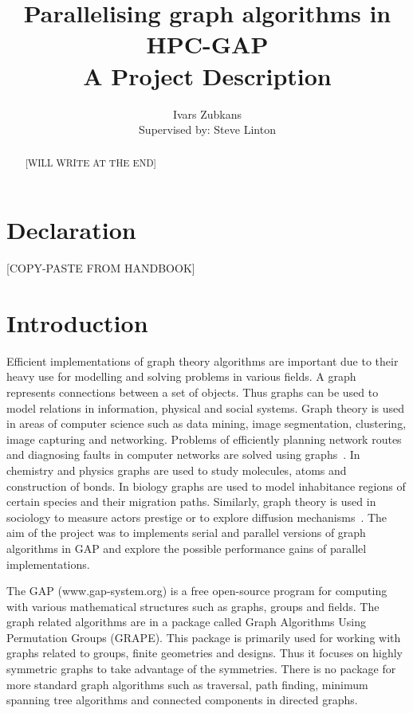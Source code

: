 \documentclass{report}
\title{Parallelising graph algorithms in HPC-GAP \\ \vspace{2 mm} {\large A Project Description}}
\author{Ivars Zubkans \\ \small Supervised by: Steve Linton}
\theoremstyle{plain}
\theoremstyle{definition}
\theoremstyle{remark}
\begin{document}
\maketitle

\begin{abstract}
[WILL WRITE AT THE END]
\end{abstract}

\chapter*{Declaration}
[COPY-PASTE FROM HANDBOOK]

\tableofcontents

\chapter{Introduction}

Efficient implementations of graph theory algorithms are important due to their heavy use for modelling and solving problems in various fields. A graph represents connections between a set of objects. Thus graphs can be used to model relations in information, physical and social systems. Graph theory is used in areas of computer science such as data mining, image segmentation, clustering, image capturing and networking. Problems of efficiently planning network routes and diagnosing faults in computer networks are solved using graphs~\cite{6005872}. In chemistry and physics graphs are used to study molecules, atoms and construction of bonds. In biology graphs are used to model inhabitance regions of certain species and their migration paths. Similarly, graph theory is used in sociology to measure actors prestige or to explore diffusion mechanisms~\cite{shirinivas2010applications}. The aim of the project was to implements serial and parallel versions of graph algorithms in GAP and explore the possible performance gains of parallel implementations.

The GAP (www.gap-system.org) is a free open-source program for computing with various mathematical structures such as graphs, groups and fields. The graph related algorithms are in a package called Graph Algorithms Using Permutation Groups (GRAPE). This package is primarily used for working with graphs related to groups, finite geometries and designs. Thus it focuses on highly symmetric graphs to take advantage of the symmetries. There is no package for more standard graph algorithms such as traversal, path finding, minimum spanning tree algorithms and connected components in directed graphs.
\end{document}
